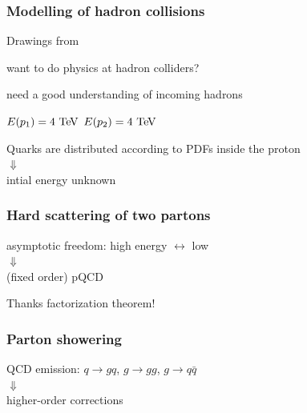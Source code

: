 

\begin{frame}\frametitle{Modelling of hadron collisions}
\small\centering

\begin{flushright}\tiny Drawings from~\cite{Gieseke}\end{flushright}

want to do physics at hadron colliders?

need a good understanding of incoming hadrons

\myskip
\myskip


$E(p_1)=4\tev$ \hspace{.3\paperwidth} $E(p_2)=4\tev$

\vspace{.3\paperheight}

Quarks are distributed according to PDFs inside the proton\\
{\LARGE $\Downarrow$}\\
intial energy unknown

\end{frame}


\begin{frame}\frametitle{Hard scattering of two partons}
\centering\myskip


\vspace{.5\paperheight}

{\cccolor asymptotic freedom}: high energy $\longleftrightarrow$ low \alphas\\
{\LARGE $\Downarrow$}\\
(fixed order) pQCD

\begin{flushright}\scriptsize Thanks {\cccolor factorization theorem}!
\end{flushright}

\end{frame}

\begin{frame}\frametitle{Parton showering}
\centering\myskip

\vspace{.55\paperheight}


QCD emission: $q\to gq$, $g\to gg$, $g\to q\bar{q}$\\
{\LARGE $\Downarrow$}\\
higher-order corrections 


\end{frame}

